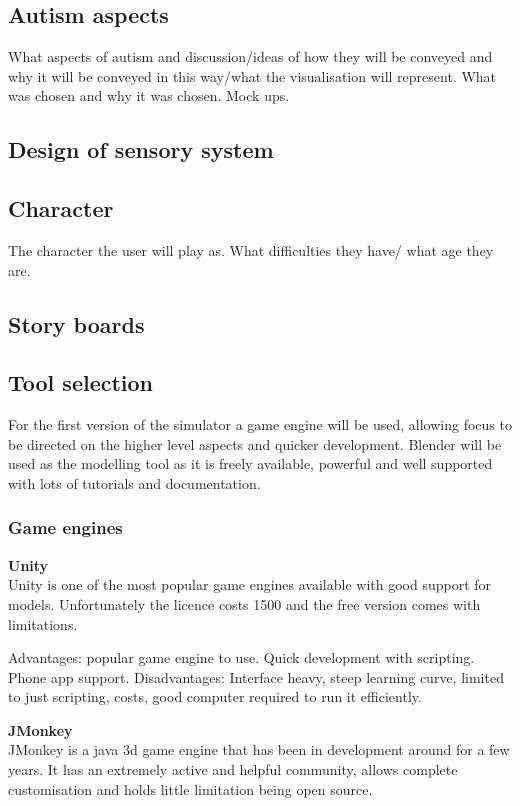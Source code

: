 \documentclass[11pt]{report}
\begin{document}
\subsection{Autism aspects}

What aspects of autism and discussion/ideas of how they will be conveyed and why it will be conveyed in this way/what the visualisation will represent.
What was chosen and why it was chosen.
Mock ups.

\subsection{Design of sensory system}

\subsection{Character}
The character the user will play as. What difficulties they have/ what age they are.

\subsection{Story boards}

\subsection{Tool selection}
For the first version of the simulator a game engine will be used, allowing focus to be directed on the higher level aspects and quicker development. Blender will be used as the modelling tool as it is freely available, powerful and well supported with lots of tutorials and documentation.

\subsubsection{Game engines}

\textbf{Unity}\\
Unity is one of the most popular game engines available with good support for models. Unfortunately the licence costs 1500 and the free version comes with limitations.

Advantages: popular game engine to use. Quick development with scripting. Phone app support.
Disadvantages: Interface heavy, steep learning curve, limited to just scripting, costs, good computer required to run it efficiently.

\textbf{JMonkey}\\
JMonkey is a java 3d game engine that has been in development around for a few years. It has an extremely active and helpful community, allows complete customisation and holds little limitation being open source.
\end{document}
